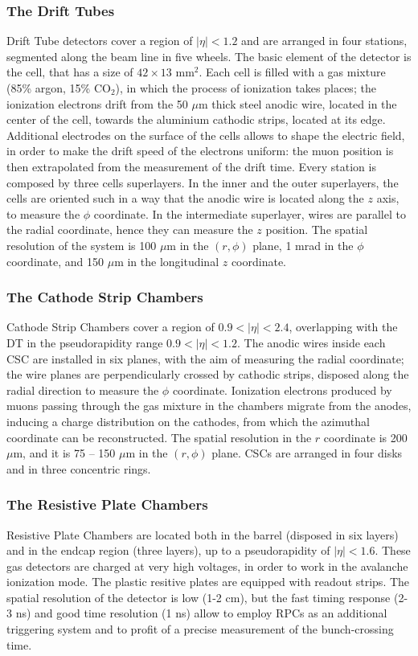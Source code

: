 \subsubsection{The Drift Tubes}
Drift Tube detectors cover a region of $|\eta|<1.2$ and are arranged in four stations, segmented along the beam line in five wheels. The basic element of the detector is the cell, that has a size of $42 \times 13 \text{ mm}^2$. Each cell is filled with a gas mixture (85\% argon, 15\% $\text{CO}_2$), in which the process of ionization takes places; the ionization electrons drift from the 50 $\mu$m thick steel anodic wire, located in the center of the cell, towards the aluminium cathodic strips, located at its edge. Additional electrodes on the surface of the cells allows to shape the electric field, in order to make the drift speed of the electrons uniform: the muon position is then extrapolated from the measurement of the drift time. Every station is composed by three cells superlayers. In the inner and the outer superlayers, the cells are oriented such in a way that the anodic wire is located along the $z$ axis, to measure the $\phi$ coordinate. In the intermediate superlayer, wires are parallel to the radial coordinate, hence they can measure the $z$ position. The spatial resolution of the system is 100 $\mu$m in the $(r, \phi)$ plane, 1 mrad in the $\phi$ coordinate, and 150 $\mu$m in the longitudinal $z$ coordinate.

\subsubsection{The Cathode Strip Chambers}
Cathode Strip Chambers cover a region of $0.9<|\eta|<2.4$, overlapping with the DT in the pseudorapidity range $0.9 < |\eta| < 1.2$. The anodic wires inside each CSC are installed in six planes, with the aim of measuring the radial coordinate; the wire planes are perpendicularly crossed by cathodic strips, disposed along the radial direction to measure the $\phi$ coordinate. Ionization electrons produced by muons passing through the gas mixture in the chambers migrate from the anodes, inducing a charge distribution on the cathodes, from which the azimuthal coordinate can be reconstructed. The spatial resolution in the $r$ coordinate is 200 $\mu$m, and it is 75 -- 150 $\mu$m in the $(r, \phi)$ plane. CSCs are arranged in four disks and in three concentric rings.

\subsubsection{The Resistive Plate Chambers}
Resistive Plate Chambers are located both in the barrel (disposed in six layers) and in the endcap region (three layers), up to a pseudorapidity of $|\eta|<1.6$. These gas detectors are charged at very high voltages, in order to work in the avalanche ionization mode. The plastic resitive plates are equipped with readout strips. The spatial resolution of the detector is low (1-2 cm), but the fast timing response (2-3 ns) and good time resolution (1 ns) allow to employ RPCs as an additional triggering system and to profit of a precise measurement of the bunch-crossing time.

